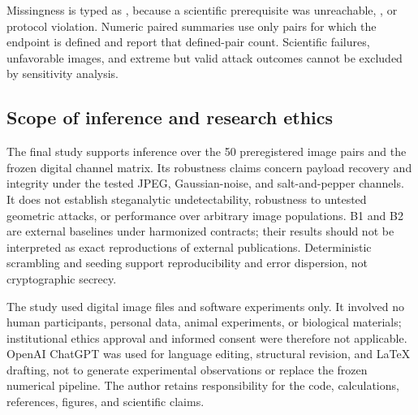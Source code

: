 Missingness is typed as ,  because a scientific prerequisite was unreachable, , or protocol violation. Numeric paired summaries use only pairs for which the endpoint is defined and report that defined-pair count. Scientific failures, unfavorable images, and extreme but valid attack outcomes cannot be excluded by sensitivity analysis.

\subsection{Scope of inference and research ethics}

The final study supports inference over the 50 preregistered image pairs and the frozen digital channel matrix. Its robustness claims concern payload recovery and integrity under the tested JPEG, Gaussian-noise, and salt-and-pepper channels. It does not establish steganalytic undetectability, robustness to untested geometric attacks, or performance over arbitrary image populations. B1 and B2 are external baselines under harmonized contracts; their results should not be interpreted as exact reproductions of external publications. Deterministic scrambling and seeding support reproducibility and error dispersion, not cryptographic secrecy.

The study used digital image files and software experiments only. It involved no human participants, personal data, animal experiments, or biological materials; institutional ethics approval and informed consent were therefore not applicable. OpenAI ChatGPT was used for language editing, structural revision, and LaTeX drafting, not to generate experimental observations or replace the frozen numerical pipeline. The author retains responsibility for the code, calculations, references, figures, and scientific claims.
